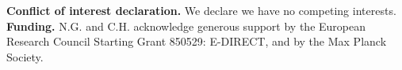 \documentclass[11pt]{article}
\theoremstyle{plainCl1}
\theoremstyle{plainCl2}
\providecommand{\DIFaddbegin}{} %
\providecommand{\DIFdelbegin}{} %
\providecommand{\DIFdelend}{} %
\begin{document}
\noindent
{\bf Conflict of interest declaration.}
We declare we have no competing interests.\\

\noindent
{\bf Funding.}
N.G. and C.H. acknowledge generous support by the European Research Council Starting Grant 850529:
E-DIRECT, and by the Max Planck Society.\\




\DIFdelbegin %
\DIFdelend %
\DIFaddbegin 
\end{document}

